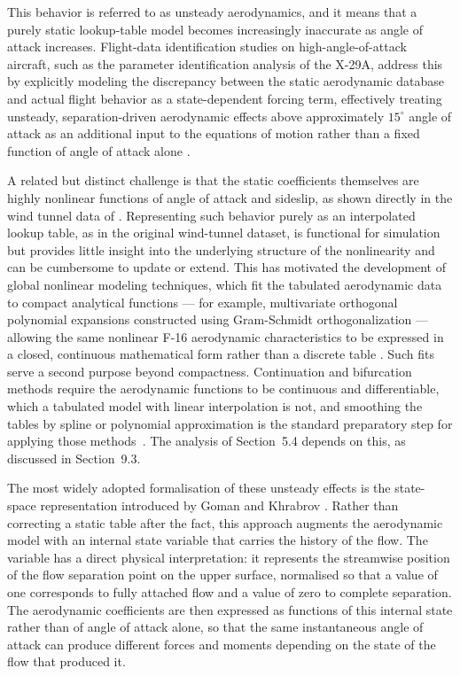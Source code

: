 \documentclass[
bindingoffset=5mm,  %
footnoteindent=3mm, %
hyphenation=true    %
]{src/wut-thesis}
\begin{document}
 This behavior is referred to as unsteady aerodynamics, and it means that a purely static lookup-table model becomes increasingly inaccurate as angle of attack increases. Flight-data identification studies on high-angle-of-attack aircraft, such as the parameter identification analysis of the X-29A, address this by explicitly modeling the discrepancy between the static aerodynamic database and actual flight behavior as a state-dependent forcing term, effectively treating unsteady, separation-driven aerodynamic effects above approximately $15^{\circ}$ angle of attack as an additional input to the equations of motion rather than a fixed function of angle of attack alone \cite{iliff1996}.
 
 A related but distinct challenge is that the static coefficients themselves are highly nonlinear functions of angle of attack and sideslip, as shown directly in the wind tunnel data of \cite[Figs.~9 and~10]{nguyen1979}. Representing such behavior purely as an interpolated lookup table, as in the original wind-tunnel dataset, is functional for simulation but provides little insight into the underlying structure of the nonlinearity and can be cumbersome to update or extend. This has motivated the development of global nonlinear modeling techniques, which fit the tabulated aerodynamic data to compact analytical functions --- for example, multivariate orthogonal polynomial expansions constructed using Gram-Schmidt orthogonalization --- allowing the same nonlinear F-16 aerodynamic characteristics to be expressed in a closed, continuous mathematical form rather than a discrete table \cite{ismail2023}. 
 Such fits serve a second purpose beyond compactness. Continuation and
 bifurcation methods require the aerodynamic functions to be continuous and
 differentiable, which a tabulated model with linear interpolation is not, and
 smoothing the tables by spline or polynomial approximation is the standard
 preparatory step for applying those methods~\cite{goman1998}. The analysis of
 Section~5.4 depends on this, as discussed in Section~9.3.
 

 The most widely adopted formalisation of these unsteady effects is the
 state-space representation introduced by Goman and Khrabrov \cite{goman1994}.
 Rather than correcting a static table after the fact, this approach augments
 the aerodynamic model with an internal state variable that carries the
 history of the flow. The variable has a direct physical interpretation: it
 represents the streamwise position of the flow separation point on the upper
 surface, normalised so that a value of one corresponds to fully attached flow
 and a value of zero to complete separation. The aerodynamic coefficients are
 then expressed as functions of this internal state rather than of angle of
 attack alone, so that the same instantaneous angle of attack can produce
 different forces and moments depending on the state of the flow that produced
 it.
 
\end{document}
